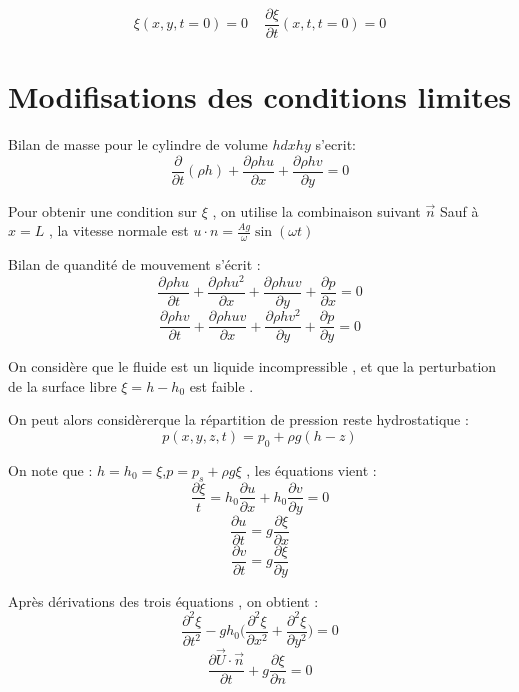 \documentclass[a4paper,10pt]{report} %
\begin{document}
\begin{equation}
\xi(x,y,t=0)=0\,\,\,\,\,\,\,\frac{\partial \xi}{\partial t}(x,t,t=0)=0
\end{equation}

\section{Modifisations des conditions limites}
Bilan de masse pour le cylindre de volume $hdxhy$ s'ecrit:
\begin{equation}
\frac{\partial}{\partial t}(\rho h)+\frac{\partial \rho h u}{\partial x}+\frac{\partial \rho h v}{\partial y}=0
\end{equation}

Pour obtenir  une condition sur $\xi$ , on utilise la combinaison suivant $\vec{n}$
 Sauf à $x=L$ , la vitesse normale est $u\cdot n=\frac{Ag}{\omega}\sin(\omega t)$ 

Bilan de quandité de mouvement s'écrit :
\begin{equation}
\frac{\partial \rho h u}{\partial t}+\frac{\partial \rho h u^2}{\partial x}+\frac{\partial \rho h uv}{\partial y}+\frac{\partial p}{\partial x}=0
\end{equation}
\begin{equation}
\frac{\partial \rho h v}{\partial t}+\frac{\partial \rho h uv}{\partial x}+\frac{\partial \rho h v^2}{\partial y}+\frac{\partial p}{\partial y}=0
\end{equation}

On considère que le fluide est un liquide incompressible , et que la perturbation de la surface libre  $\xi=h-h_0$ est faible .

On peut alors considèrerque la répartition de pression reste hydrostatique :
\begin{equation}
p(x,y,z,t)=p_0+\rho g(h-z)
\end{equation}

On note que : $h=h_0=\xi$,$p=p_s+\rho g\xi$ , les équations vient :
$$\frac{\partial \xi}{t}=h_0 \frac{\partial u}{\partial x}+h_0 \frac{\partial v}{\partial y}=0$$
$$\frac{\partial u}{\partial t}=g\frac{\partial \xi}{\partial x}$$
$$\frac{\partial v}{\partial t}=g\frac{\partial \xi}{\partial y}$$

Après dérivations des trois équations , on obtient :
\begin{equation}
\frac{\partial ^2\xi}{\partial t^2}-gh_0\Big(\frac{\partial ^2\xi}{\partial x^2}+\frac{\partial ^2\xi}{\partial y^2}\Big)=0
\label{propagation}
\end{equation}
\begin{equation}
\frac{\partial\vec{U}\cdot\vec{n}}{\partial t}+g\frac{\partial \xi}{\partial n}=0
\label{conditionlimite}
\end{equation}
\end{document}
